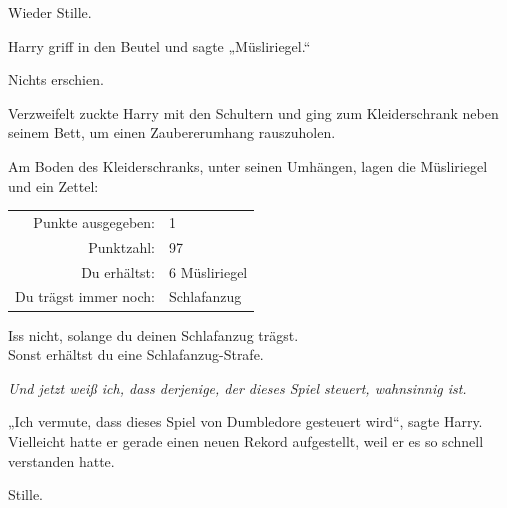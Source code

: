 Wieder Stille.

Harry griff in den Beutel und sagte
„Müsliriegel.“

Nichts erschien.

Verzweifelt zuckte Harry mit den Schultern und ging zum Kleiderschrank neben seinem Bett, um einen Zaubererumhang rauszuholen.

Am Boden des Kleiderschranks, unter seinen Umhängen, lagen die Müsliriegel und ein Zettel:
\begin{writtenNote}
\begin{tabular}{rl}
Punkte ausgegeben: & 1\\
Punktzahl: & 97\\
Du erhältst: & 6 Müsliriegel\\
Du trägst immer noch: & Schlafanzug\\
\end{tabular}

Iss nicht, solange du deinen Schlafanzug trägst.\\
Sonst erhältst du eine Schlafanzug-Strafe.
\end{writtenNote}

\emph{Und jetzt weiß ich, dass derjenige, der dieses Spiel steuert, wahnsinnig ist.}


„Ich vermute, dass dieses Spiel von Dumbledore gesteuert wird“, sagte Harry. Vielleicht hatte er gerade einen neuen Rekord aufgestellt, weil er es so schnell verstanden hatte.

Stille.

